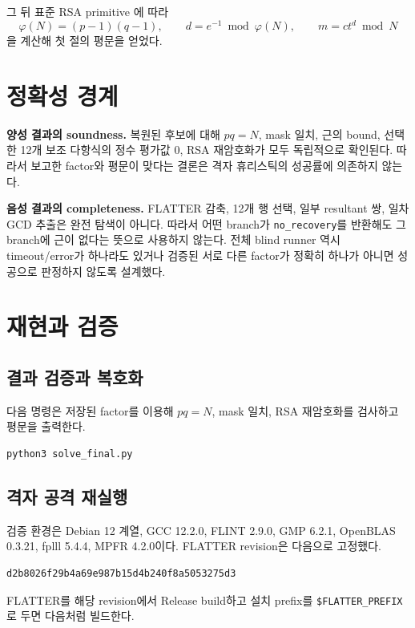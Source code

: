 \documentclass[10pt,a4paper]{article}
\begin{document}
그 뒤 표준 RSA primitive \cite{rfc8017}에 따라
\[
 \varphi(N)=(p-1)(q-1),\qquad
 d=e^{-1}\bmod\varphi(N),\qquad m=ct^d\bmod N
\]
을 계산해 첫 절의 평문을 얻었다.

\section{정확성 경계}

\textbf{양성 결과의 soundness.}
복원된 후보에 대해 \(pq=N\), mask 일치, 근의 bound, 선택한 12개 보조
다항식의 정수 평가값 0, RSA 재암호화가 모두 독립적으로 확인된다.
따라서 보고한 factor와 평문이 맞다는 결론은 격자 휴리스틱의 성공률에
의존하지 않는다.

\textbf{음성 결과의 completeness.}
FLATTER 감축, 12개 행 선택, 일부 resultant 쌍, 일차 GCD 추출은
완전 탐색이 아니다. 따라서 어떤 branch가 \texttt{no\_recovery}를
반환해도 그 branch에 근이 없다는 뜻으로 사용하지 않는다. 전체 blind
runner 역시 timeout/error가 하나라도 있거나 검증된 서로 다른 factor가
정확히 하나가 아니면 성공으로 판정하지 않도록 설계했다.

\section{재현과 검증}

\subsection{결과 검증과 복호화}

다음 명령은 저장된 factor를 이용해 \(pq=N\), mask 일치,
RSA 재암호화를 검사하고 평문을 출력한다.

\begin{lstlisting}
python3 solve_final.py
\end{lstlisting}

\subsection{격자 공격 재실행}

검증 환경은 Debian 12 계열, GCC 12.2.0, FLINT 2.9.0, GMP 6.2.1,
OpenBLAS 0.3.21, fplll 5.4.4, MPFR 4.2.0이다. FLATTER revision은
다음으로 고정했다.

\begin{lstlisting}
d2b8026f29b4a69e987b15d4b240f8a5053275d3
\end{lstlisting}

FLATTER를 해당 revision에서 Release build하고 설치 prefix를
\texttt{\$FLATTER\_PREFIX}로 두면 다음처럼 빌드한다.
\end{document}
